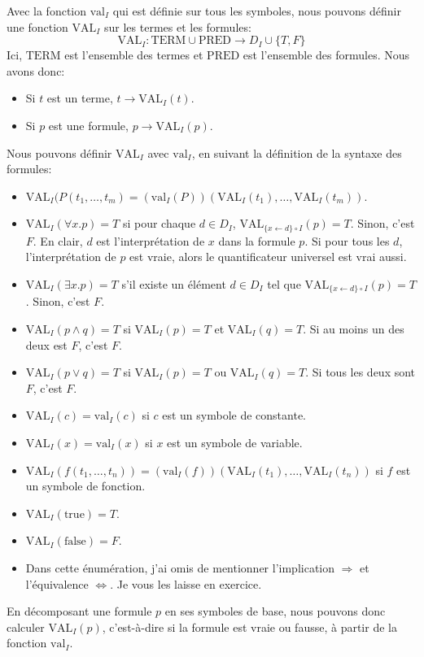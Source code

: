 Avec la fonction $\mathrm{val}_I$ qui est définie sur tous les symboles, nous pouvons définir une fonction
$\mathrm{VAL}_I$ sur les termes et les formules:
\begin{equation}
\mathrm{VAL}_I : \mathrm{TERM} \cup \mathrm{PRED} \rightarrow D_I \cup \{T, F\}
\end{equation}
Ici, $\mathrm{TERM}$ est l'ensemble des termes et $\mathrm{PRED}$ est l'ensemble des formules.
Nous avons donc:
\begin{itemize}
\item Si $t$ est un terme, $t \rightarrow \mathrm{VAL}_I(t)$.
\item Si $p$ est une formule, $p \rightarrow \mathrm{VAL}_I(p)$.
\end{itemize}
Nous pouvons définir $\mathrm{VAL}_I$ avec $\mathrm{val}_I$, en suivant la définition de la syntaxe des formules:
\begin{itemize}
\item $\mathrm{VAL}_I ( P(t_1, \ldots, t_m) = (\mathrm{val}_I(P)) (\mathrm{VAL}_I(t_1), \ldots, \mathrm{VAL}_I(t_m))$.
\item $\mathrm{VAL}_I ( \forall x.p ) = T$ si pour chaque $d \in D_I$, $\mathrm{VAL}_{\{x \leftarrow d\} \circ I}(p) = T$.  Sinon, c'est $F$.
En clair, $d$ est l'interprétation de $x$ dans la formule $p$.  Si pour tous les $d$, l'interprétation de $p$ est vraie, alors le
quantificateur universel est vrai aussi.
\item $\mathrm{VAL}_I ( \exists x.p ) = T$ s'il existe un élément $d \in D_I$ tel que $\mathrm{VAL}_{\{x \leftarrow d\} \circ I}(p) = T$.
Sinon, c'est $F$.
\item $\mathrm{VAL}_I(p \wedge q) = T$ si $\mathrm{VAL}_I(p)=T$ et $\mathrm{VAL}_I(q)=T$.  Si au moins un des deux est $F$, c'est $F$.
\item $\mathrm{VAL}_I(p \vee q) = T$ si $\mathrm{VAL}_I(p)=T$ ou $\mathrm{VAL}_I(q)=T$.  Si tous les deux sont $F$, c'est $F$.
\item $\mathrm{VAL}_I(c) = \mathrm{val}_I(c)$ si $c$ est un symbole de constante.
\item $\mathrm{VAL}_I(x) = \mathrm{val}_I(x)$ si $x$ est un symbole de variable.
\item $\mathrm{VAL}_I(f(t_1, \ldots, t_n)) = (\mathrm{val}_I(f))(\mathrm{VAL}_I(t_1), \ldots, \mathrm{VAL}_I(t_n))$ si $f$ est un symbole de fonction.
\item $\mathrm{VAL}_I(\mathrm{true}) = T$.
\item $\mathrm{VAL}_I(\mathrm{false}) = F$.
\item Dans cette énumération, j'ai omis de mentionner l'implication $\Rightarrow$ et l'équivalence $\Leftrightarrow$.
Je vous les laisse en exercice.
\end{itemize}
En décomposant une formule $p$ en ses symboles de base, nous pouvons donc calculer $\mathrm{VAL}_I(p)$, c'est-à-dire si la formule
est vraie ou fausse, à partir de la fonction $\mathrm{val}_I$.

